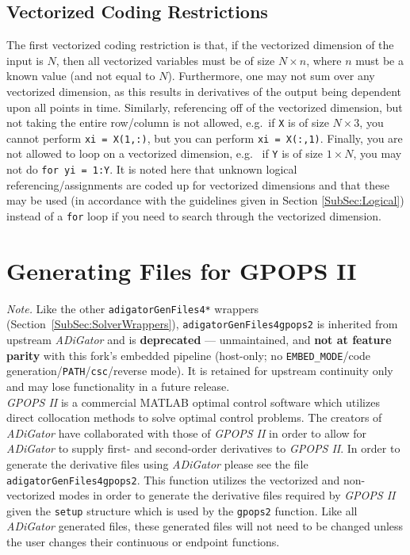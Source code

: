 \documentclass[10pt,pdftex]{article}
\begin{document}
\subsection{Vectorized Coding Restrictions}
The first vectorized coding restriction is that, if the vectorized dimension of the input is $N$, then all vectorized variables must be of size $N \times n$, where $n$ must be a known value (and not equal to $N$). Furthermore, one may not sum over any vectorized dimension, as this results in derivatives of the output being dependent upon all points in time. Similarly, referencing off of the vectorized dimension, but not taking the entire row/column is not allowed, e.g.~if \texttt{X} is of size $N \times 3$, you cannot perform \texttt{xi = X(1,:)}, but you can perform \texttt{xi = X(:,1)}. Finally, you are not allowed to loop on a vectorized dimension, e.g.~ if \texttt{Y} is of size $1 \times N$, you may not do \texttt{for yi = 1:Y}. It is noted here that unknown logical referencing/assignments are coded up for vectorized dimensions and that these may be used (in accordance with the guidelines given in Section \ref{SubSec:Logical}) instead of a \texttt{for} loop if you need to search through the vectorized dimension.

\section{Generating Files for GPOPS II}
\emph{Note.} Like the other \texttt{adigatorGenFiles4*} wrappers (Section~\ref{SubSec:SolverWrappers}), \texttt{adigatorGenFiles4gpops2} is inherited from upstream \emph{ADiGator} and is \textbf{deprecated} --- unmaintained, and \textbf{not at feature parity} with this fork's embedded pipeline (host-only; no \texttt{EMBED\_MODE}/code generation/\texttt{PATH}/\texttt{csc}/reverse mode). It is retained for upstream continuity only and may lose functionality in a future release.\\
{\em GPOPS II} is a commercial MATLAB optimal control software which utilizes direct collocation methods to solve optimal control problems.
The creators of {\em ADiGator} have collaborated with those of {\em GPOPS II} in order to allow for {\em ADiGator} to supply first- and second-order derivatives to {\em GPOPS II}.
In order to generate the derivative files using {\em ADiGator} please see the file \texttt{adigatorGenFiles4gpops2}.
This function utilizes the vectorized and non-vectorized modes in order to generate the derivative files required by {\em GPOPS II} given the \texttt{setup} structure which is used by the \texttt{gpops2} function.
Like all {\em ADiGator} generated files, these generated files will not need to be changed unless the user changes their continuous or endpoint functions.
\end{document}
